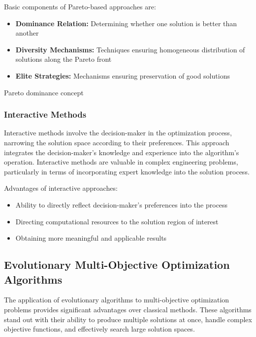 Basic components of Pareto-based approaches are:
\begin{itemize}
    \item \textbf{Dominance Relation:} Determining whether one solution is better than another
    \item \textbf{Diversity Mechanisms:} Techniques ensuring homogeneous distribution of solutions along the Pareto front
    \item \textbf{Elite Strategies:} Mechanisms ensuring preservation of good solutions
\end{itemize}

\begin{marginfigure}
\centering
{}
\caption{Pareto dominance concept}
\end{marginfigure}

\subsubsection{Interactive Methods}
Interactive methods involve the decision-maker in the optimization process, narrowing the solution space according to their preferences. This approach integrates the decision-maker's knowledge and experience into the algorithm's operation. Interactive methods are valuable in complex engineering problems, particularly in terms of incorporating expert knowledge into the solution process.

Advantages of interactive approaches:
\begin{itemize}
    \item Ability to directly reflect decision-maker's preferences into the process
    \item Directing computational resources to the solution region of interest
    \item Obtaining more meaningful and applicable results
\end{itemize}

\subsection{Evolutionary Multi-Objective Optimization Algorithms}
The application of evolutionary algorithms to multi-objective optimization problems provides significant advantages over classical methods. These algorithms stand out with their ability to produce multiple solutions at once, handle complex objective functions, and effectively search large solution spaces.


